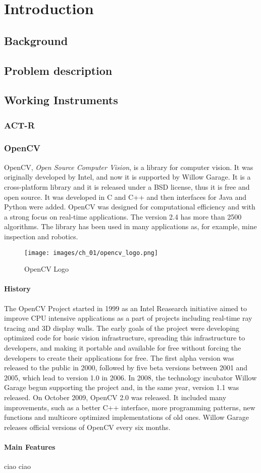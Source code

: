 \chapter{Introduction}
\section{Background}
\section{Problem description}
\section{Working Instruments}
\subsection{ACT-R}
\subsection{OpenCV}
	OpenCV, \emph{Open Source Computer Vision}, is a library for computer vision. It was originally developed by Intel, and now it is supported by Willow Garage.
	It is a cross-platform library and it is released under a BSD license, thus it is free and open source. It was developed in C and C++ and then interfaces for Java and Python were added. OpenCV was designed for computational efficiency and with a strong focus on real-time applications. The version 2.4 has more than 2500 algorithms. The library has been used in many applications as, for example, mine inspection and robotics.
	\begin{wrapfigure}{l}{0.2\textwidth}
  		\begin{center}
  	  	\texttt{[image: images/ch\_01/opencv\_logo.png]}
  		\end{center}
  		\caption{OpenCV Logo}
	\end{wrapfigure}		
	
	\subsubsection*{History}
	The OpenCV Project started in 1999 as an Intel Reasearch initiative aimed to improve CPU intensive applications as a part of projects including real-time ray tracing and 3D display walls. The early goals of the project were developing optimized code for basic vision infrastructure, spreading this infrastructure to developers, and making it portable and available for free without forcing the developers to create their applications for free.
	The first alpha version was released to the public in 2000, followed by five beta versions between 2001 and 2005, which lead to version 1.0 in 2006. In 2008, the technology incubator Willow Garage begun supporting the project and, in the same year, version 1.1  was released. 
	On October 2009, OpenCV 2.0 was released. It included many improvements, such as a better C++ interface, more programming patterns, new functions and multicore optimized implementations of old ones. Willow Garage releases official versions of OpenCV every six months.
	\subsubsection*{Main Features}
	ciao ciao